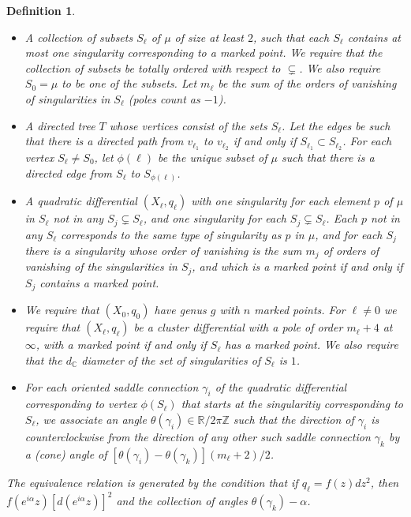 \documentclass[12pt]{article}
\newtheorem{definition}[theorem]{Definition}
\newcommand{\zz}{\mathbb{Z}}
\newcommand{\rr}{\mathbb{R}}
\newcommand{\cc}{\mathbb{C}}
\begin{document}
\begin{definition}
\begin{itemize}
\item A collection of subsets $S_\ell$ of $\mu$ of size at least $2$, such that each $S_\ell$ contains at most one singularity corresponding to a marked point. We require that the collection of subsets be totally ordered with respect to $\subsetneq$. We also require $S_0 = \mu$ to be one of the subsets. Let $m_\ell$ be the sum of the orders of vanishing of singularities in $S_\ell$ (poles count as $-1$).
\item A directed tree $T$ whose vertices consist of the sets $S_\ell$. Let the edges be such that there is a directed path from $v_{\ell_1}$ to $v_{\ell_2}$ if and only if $S_{\ell_1} \subset S_{\ell_2}$. For each vertex $S_\ell \neq S_0$, let $\phi(\ell)$ be the unique subset of $\mu$ such that there is a directed edge from $S_\ell$ to $S_{\phi(\ell)}$.
\item A quadratic differential $(X_\ell,q_\ell)$ with one singularity for each element $p$ of $\mu$ in $S_\ell$ not in any $S_j \subsetneq S_\ell$, and one singularity for each $S_j \subsetneq S_\ell$. Each $p$ not in any $S_\ell$ corresponds to the same type of singularity as $p$ in $\mu$, and for each $S_j$ there is a singularity whose order of vanishing is the sum $m_j$ of orders of vanishing of the singularities in $S_j$, and which is a marked point if and only if $S_j$ contains a marked point.
\item We require that $(X_0,q_0)$ have genus $g$ with $n$ marked points. For $\ell \neq 0$ we require that $(X_\ell,q_\ell)$ be a cluster differential with a pole of order $m_\ell+4$ at $\infty$, with a marked point if and only if $S_\ell$ has a marked point. We also require that the $d_\cc$ diameter of the set of singularities of $S_\ell$ is $1$.
\item For each oriented saddle connection $\gamma_i$ of the quadratic differential corresponding to vertex $\phi(S_\ell)$ that starts at the singularitiy corresponding to $S_\ell$, we associate an angle $\theta(\gamma_i) \in \rr/2\pi\zz$ such that the direction of $\gamma_i$ is counterclockwise from the direction of any other such saddle connection $\gamma_k$ by a (cone) angle of $[\theta(\gamma_i) - \theta(\gamma_k)](m_\ell+2)/2$.
\end{itemize}
The equivalence relation is generated by the condition that if $q_\ell = f(z)dz^2$, then $f(e^{i \alpha} z)[d(e^{i \alpha}z)]^2$ and the collection of angles $\theta(\gamma_k) - \alpha$.
\end{definition}
\end{document}
